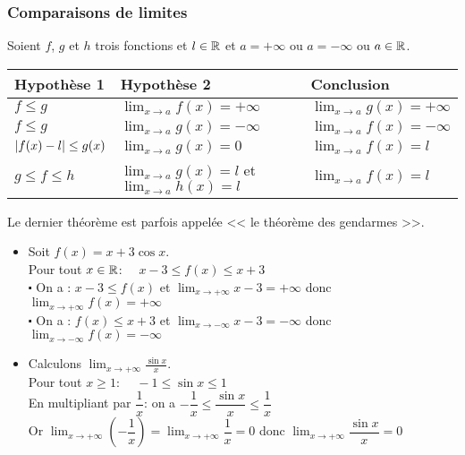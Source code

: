  \subsubsection*{Comparaisons de limites}
\begin{theorem}
Soient $f $, $g$ et $h$ trois fonctions et $ l\in\mathbb{R}$ et  $ a= +\infty $ ou $ a=-\infty $ ou $ a\in\mathbb{R} $.


\begin{tabularx}{\textwidth}{|X|X|X|}
\hline
\textbf{ Hypothèse 1}  & \textbf{Hypothèse 2} & \textbf{ Conclusion }\\
\hline
$ f\leq g $  & $ \displaystyle \lim_{x \to a}f(x)=+\infty $ & $\displaystyle \lim_{x \to a}g(x)=+\infty $ \\
 \hline
 $ f\leq g $  & $\displaystyle \lim_{x \to a}g(x)=-\infty $ & $ \displaystyle \lim_{x \to a}f(x)=-\infty $    \\
\hline
$ \left\lvert f(x)-l  \right\rvert\leq g(x) $ & $\displaystyle \lim_{x \to a}g(x)=0$ & $ \displaystyle \lim_{x \to a}f(x)=l  $ \\
\hline
$ g \leq f \leq h $ & $ \displaystyle \lim_{x \to a}g(x)=l $ et $ \displaystyle \lim_{x \to a}h(x)=l $ & $ \displaystyle \lim_{x \to a}f(x)=l $    \\
\hline
\end{tabularx}
\end{theorem}

\begin{remark}
Le dernier théorème est parfois appelée << le théorème des gendarmes >>.
 \end{remark}

\begin{example}
\begin{itemize}
\item  Soit $ f(x)= x+ 3\cos x $.\\
Pour tout $x\in\mathbb{R}$:  $\quad x-3\leq f(x)\leq x+3 $ \\
$ \centerdot $  On a : $ x-3\leq f(x)$ et $\displaystyle \lim_{x \to +\infty}x-3=+\infty  $ donc $ \displaystyle \lim_{x \to +\infty}f(x)=+\infty $\\
$ \centerdot $ On a :  $  f(x)\leq x+3$ et $\displaystyle \lim_{x \to -\infty}x-3=-\infty  $ donc $ \displaystyle \lim_{x \to -\infty}f(x)=-\infty $ \\

\item  Calculons $\displaystyle\lim_{x \to +\infty}\frac{\sin x}{x} $.\\

Pour tout $ x\geq 1 $: $\quad  -1\leq\sin x \leq 1 $ \\
En multipliant par $ \dfrac{1}{x} $: on a $ -\dfrac{1}{x}\leq \dfrac{\sin x}{x} \leq\dfrac{1}{x} $\\
Or $\displaystyle\lim_{x \to +\infty}(-\dfrac{1}{x})= \displaystyle\lim_{x \to +\infty}\dfrac{1}{x}=0$ donc $\displaystyle\lim_{x \to +\infty}\dfrac{\sin x}{x}=0 $
\end{itemize}

\end{example}

